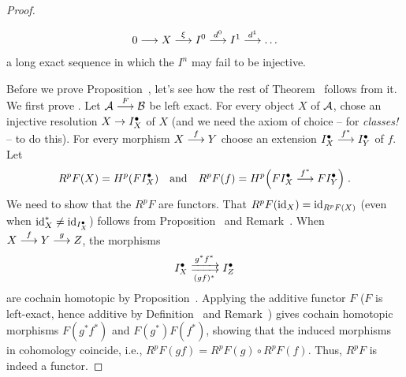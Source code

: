 \documentclass[a4paper,parskip=half,numbers=enddot, DIV=12]{scrreprt}
\begin{document}
\begin{proof}
\begin{rem}
\begin{alphanumerate}
\begin{align*}
					0\morphism X\morphism[\xi]I^0\morphism[d^0]I^1\morphism[d^1]\ldots 
				\end{align*}
				a long exact sequence in which the $I^n$ may fail to be injective. 
			\end{alphanumerate}
		\end{rem}
		Before we prove Proposition~, let's see how the rest of Theorem~ follows from it. We first prove . Let $\Aa\morphism[F]\Bb$ be left exact. For every object $X$ of $\mathcal{A}$, chose an injective resolution $X\morphism I_X^\bullet $ of $X$ (and we need the axiom of choice -- for \emph{classes!} -- to do this). For every morphism $X\morphism[f]Y$ choose an extension $I_X^\bullet \morphism[f^* ]I_Y^\bullet $ of $f$. Let
		\begin{align*}
			R^pF(X)=H^p(FI_X^\bullet )\quad\text{and}\quad R^pF(f)=H^p\Big(FI_X^\bullet \morphism[f^* ]FI_Y^\bullet \Big)\;.
		\end{align*}
		We need to show that the $R^pF$ are functors. That $R^pF(\operatorname{id}_X)=\operatorname{id}_{R^pF(X)}$ (even when $\operatorname{id}_X^* \neq \operatorname{id}_{I_X^\bullet }$) follows from Proposition~ and Remark~. When $X\morphism[f]Y\morphism[g]Z$, the morphisms 
		\begin{align*}
			I_X^\bullet \xdoublemorphism[g^* f^* ][(gf)^* ]I_Z^\bullet 
		\end{align*}
		are cochain homotopic by Proposition~. Applying the additive functor $F$ ($F$ is left-exact, hence additive by Definition~ and Remark~) gives cochain homotopic morphisms $F(g^* f^* )$ and $F(g^* )F(f^*)$, showing that the induced morphisms in cohomology coincide, i.e., $R^pF(gf)=R^pF(g)\circ R^pF(f)$. Thus, $R^pF$ is indeed a functor.
		

\end{proof}
\end{document}
